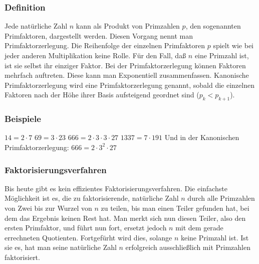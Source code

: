 \subsubsection{Definition}
Jede natürliche Zahl $n$ kann als Produkt von Primzahlen $p$, den sogenannten Primfaktoren, dargestellt werden. Diesen Vorgang nennt man Primfaktorzerlegung. Die Reihenfolge der einzelnen Primfaktoren $p$ spielt wie bei jeder anderen Multiplikation keine Rolle. Für den Fall, daß $n$ eine Primzahl ist, ist sie selbst ihr einziger Faktor. Bei der Primfaktorzerlegung können Faktoren mehrfach auftreten. Diese kann man Exponentiell zusammenfassen. Kanonische Primfaktorzerlegung wird eine Primfaktorzerlegung genannt, sobald die einzelnen Faktoren nach der Höhe ihrer Basis aufsteigend geordnet sind ($p_k < p_{k+1}$).
\subsubsection{Beispiele}
$14 = 2 \cdot 7$\newline
$69 = 3 \cdot 23$\newline
$666 = 2 \cdot 3 \cdot 3 \cdot 27$\newline
$1337 = 7 \cdot 191$\newline\newline
Und in der Kanonischen Primfaktorzerlegung:\newline\newline
$666 = 2 \cdot 3^2 \cdot 27$
\subsubsection{Faktorisierungsverfahren}
Bis heute gibt es kein effizientes Faktorisierungsverfahren. Die einfachste Möglichkeit ist es, die zu faktorisierende, natürliche Zahl $n$ durch alle Primzahlen von Zwei bis zur Wurzel von $n$ zu teilen, bis man einen Teiler gefunden hat, bei dem das Ergebnis keinen Rest hat. Man merkt sich nun diesen Teiler, also den ersten Primfaktor, und führt nun fort, ersetzt jedoch $n$ mit dem gerade errechneten Quotienten. Fortgefürht wird dies, solange $n$ keine Primzahl ist. Ist sie es, hat man seine natürliche Zahl $n$ erfolgreich ausschließlich mit Primzahlen faktorisiert.
